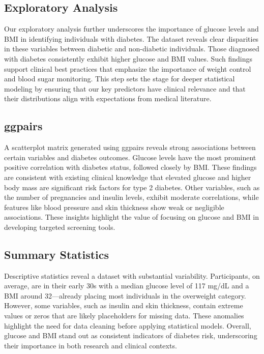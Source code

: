 \documentclass[
]{article}
\begin{document}
\subsection{Exploratory Analysis}\label{exploratory-analysis-1}

Our exploratory analysis further underscores the importance of glucose
levels and BMI in identifying individuals with diabetes. The dataset
reveals clear disparities in these variables between diabetic and
non-diabetic individuals. Those diagnosed with diabetes consistently
exhibit higher glucose and BMI values. Such findings support clinical
best practices that emphasize the importance of weight control and blood
sugar monitoring. This step sets the stage for deeper statistical
modeling by ensuring that our key predictors have clinical relevance and
that their distributions align with expectations from medical
literature.

\subsection{ggpairs}\label{ggpairs-1}

A scatterplot matrix generated using ggpairs reveals strong associations
between certain variables and diabetes outcomes. Glucose levels have the
most prominent positive correlation with diabetes status, followed
closely by BMI. These findings are consistent with existing clinical
knowledge that elevated glucose and higher body mass are significant
risk factors for type 2 diabetes. Other variables, such as the number of
pregnancies and insulin levels, exhibit moderate correlations, while
features like blood pressure and skin thickness show weak or negligible
associations. These insights highlight the value of focusing on glucose
and BMI in developing targeted screening tools.

\subsection{Summary Statistics}\label{summary-statistics}

Descriptive statistics reveal a dataset with substantial variability.
Participants, on average, are in their early 30s with a median glucose
level of 117 mg/dL and a BMI around 32---already placing most
individuals in the overweight category. However, some variables, such as
insulin and skin thickness, contain extreme values or zeros that are
likely placeholders for missing data. These anomalies highlight the need
for data cleaning before applying statistical models. Overall, glucose
and BMI stand out as consistent indicators of diabetes risk,
underscoring their importance in both research and clinical contexts.
\end{document}
